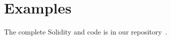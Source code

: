 \documentclass[nonacm, dvipsnames, usenames, sigconf]{acmart}
\begin{document}
\section{Examples}
The complete Solidity and \langName code is in our repository~\cite{psamatheRepo}.
%         
%         
%         
%         
\end{document}
